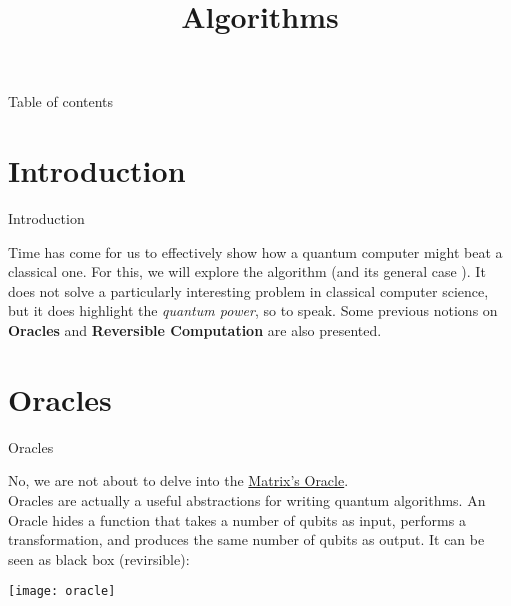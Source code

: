 \documentclass[aspectratio=43]{beamer}
\title{\q Algorithms}
\begin{document}
\begin{frame}
	\titlepage
\end{frame}


\begin{frame}{Table of contents}
	\begin{card}
		\tableofcontents
	\end{card}
\end{frame}


\section{Introduction}
\begin{frame}{Introduction}
    \begin{card}
        Time has come for us to effectively show how a quantum computer might beat a classical one. For this, we will explore the \ds algorithm (and its general case \djs). It does not solve a particularly interesting problem in classical computer science, but it does highlight the \textit{quantum power}, so to speak. Some previous notions on \textbf{\q Oracles} and \textbf{Reversible Computation} are also presented.
    \end{card}
\pagenumber
\end{frame}

\section{\q Oracles}
\begin{frame}{\q Oracles}
\begin{card}
    No, we are not about to delve into the \href{https://en.wikipedia.org/wiki/The_Oracle_(The_Matrix)}{Matrix's Oracle}.\\
    \q Oracles are actually a useful abstractions for writing quantum algorithms. An Oracle hides a function that takes a number of qubits as input, performs a transformation, and produces the same number of qubits as output. It can be seen as black box (revirsible):
    \begin{center}
        \texttt{[image: oracle]}
    \end{center}
\end{card}
\pagenumber
\end{frame}
\end{document}
